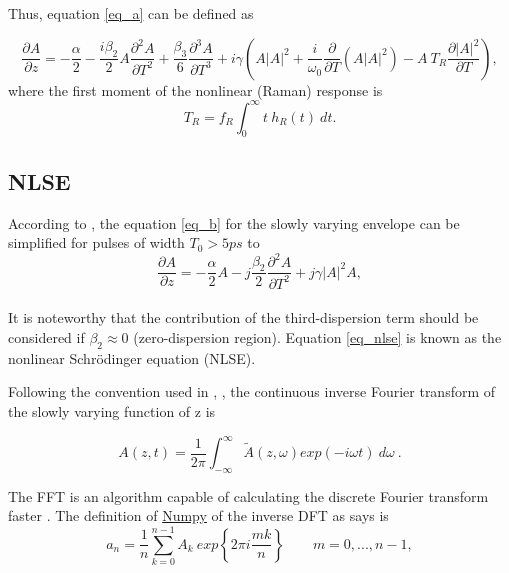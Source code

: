     Thus, equation \eqref{eq_a} can be defined as 
    
    \begin{equation}\label{eq_b}
        \frac{\partial A}{\partial z}=-\frac{\alpha}{2} - \frac{i \beta_2}{2}A \frac{\partial^2 A}{\partial T^2} +\frac{\beta_3}{6} \frac{\partial^3 A}{\partial T^3} +i \gamma   \left(A\left|A\right|^2+ \frac{i}{\omega_0} \frac{\partial}{\partial T} (A\left|A \right|^2)- A \ T_R \frac{\partial \left|A \right|^2}{\partial T} \right),
        \end{equation}
    where the first moment of the nonlinear (Raman) response is
    \begin{equation}\label{eq_TR}
        T_R = f_R\int_{0}^{\infty} t \ h_R(t) \ dt.
    \end{equation}

        
    \subsection{NLSE}
        According to \citep{AgrawalBook}, the equation  \eqref{eq_b} for the slowly varying envelope can be simplified for pulses of width $T_0 > 5 ps$ to
        \begin{equation}
                \frac{\partial A}{\partial z} = -\frac{\alpha}{2}A-j \frac{\beta_2}{2}\frac{\partial^2A}{\partial T^2}+j\gamma|A|^2 A,
                \label{eq_nlse}
            \end{equation}
            \ \\
       It is noteworthy that the contribution of the third-dispersion term should be considered if $\beta_2 \approx 0$ (zero-dispersion region). Equation \eqref{eq_nlse} is known as the nonlinear Schrödinger equation (NLSE).

           Following the convention used in \cite{AgrawalBook}, \cite{dudley_taylor_2010} , the continuous inverse Fourier transform of the slowly varying function of z is
        
        \begin{equation}\label{eq_acft}
            A(z,t) = \frac{1}{2\pi} \int_{-\infty}^{\infty} %
            \tilde{A}(z,\omega)exp(-i\omega t) \ d\omega \ .
        \end{equation}
        
        
        The FFT is an algorithm capable of calculating the discrete Fourier transform faster \citep{Lynch2018}. The definition of \href{https://numpy.org/doc/stable/index.html}{Numpy} of the inverse DFT as \cite{dft} says is 
        \begin{equation}\label{eq_dft}
            a_n = \frac{1}{n}\sum_{k=0}^{n-1} A_k \ exp\left\{ 2\pi i \frac{mk}{n} \right\} \qquad m = 0,...,n-1,
        \end{equation}

